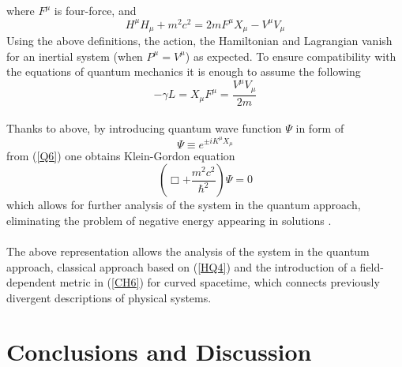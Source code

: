 \documentclass[aps,prx,preprint,groupedaddress,showkeys]{revtex4-2}
\begin{document}
where $F^{\mu}$ is four-force, and
\begin{equation} \label{Q6}
H^{\mu} H_{\mu} + m^2c^2 = 2m F^{\mu}X_{\mu} - V^{\mu} V_{\mu}
\end{equation}
Using the above definitions, the action, the Hamiltonian and Lagrangian vanish for an inertial system (when $P^{\mu} = V^{\mu}$) as expected. To ensure compatibility with the equations of quantum mechanics it is enough to assume the following
\begin{equation} \label{Q7}
- \gamma L =  X_{\mu} F^{\mu} = \frac{V^{\mu} V_{\mu}}{2m}
\end{equation}
~\\
Thanks to above, by introducing quantum wave function $\Psi$ in form of 
\begin{equation} \label{Q8}
\Psi \equiv e^{\pm iK^{\mu} X_{\mu}}
\end{equation} 
from (\ref{Q6}) one obtains Klein-Gordon equation
\begin{equation} \label{Q9}
\left ( \Box + \frac{m^2c^2}{\hbar^2} \right ) \Psi = 0
\end{equation} 
which allows for further analysis of the system in the quantum approach, eliminating the problem of negative energy appearing in solutions \cite{KGE}. \\
~\\
The above representation allows the analysis of the system in the quantum approach, classical approach based on (\ref{HQ4}) and the introduction of a field-dependent metric in (\ref{CH6}) for curved spacetime, which connects previously divergent descriptions of physical systems.

\section{Conclusions and Discussion} \label{3Chap}
\end{document}
